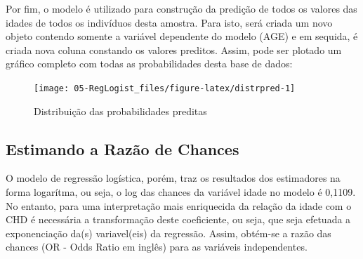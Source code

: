 \documentclass[12pt,brazil,oneside]{book}
\newenvironment{Shaded}{\begin{snugshade}}{\end{snugshade}}
\newcommand{\CommentTok}[1]{\textcolor[rgb]{0.56,0.35,0.01}{\textit{#1}}}
\newcommand{\DataTypeTok}[1]{\textcolor[rgb]{0.13,0.29,0.53}{#1}}
\newcommand{\DecValTok}[1]{\textcolor[rgb]{0.00,0.00,0.81}{#1}}
\newcommand{\KeywordTok}[1]{\textcolor[rgb]{0.13,0.29,0.53}{\textbf{#1}}}
\newcommand{\NormalTok}[1]{#1}
\newcommand{\OperatorTok}[1]{\textcolor[rgb]{0.81,0.36,0.00}{\textbf{#1}}}
\newcommand{\StringTok}[1]{\textcolor[rgb]{0.31,0.60,0.02}{#1}}
\begin{document}
Por fim, o modelo é utilizado para construção da predição de todos os
valores das idades de todos os indivíduos desta amostra. Para isto, será
criada um novo objeto contendo somente a variável dependente do modelo
(AGE) e em sequida, é criada nova coluna constando os valores preditos.
Assim, pode ser plotado um gráfico completo com todas as probabilidades
desta base de dados:

\begin{Shaded}
\end{Shaded}

\begin{figure}[h]

{\centering \texttt{[image: 05-RegLogist\_files/figure-latex/distrpred-1]} 

}

\caption{Distribuição das probabilidades preditas}\label{fig:distrpred}
\end{figure}

\hypertarget{estimando-a-razao-de-chances}{%
\subsection{Estimando a Razão de
Chances}\label{estimando-a-razao-de-chances}}

O modelo de regressão logística, porém, traz os resultados dos
estimadores na forma logarítma, ou seja, o log das chances da variável
idade no modelo é 0,1109. No entanto, para uma interpretação mais
enriquecida da relação da idade com o CHD é necessária a transformação
deste coeficiente, ou seja, que seja efetuada a exponenciação da(s)
variavel(eis) da regressão. Assim, obtém-se a razão das chances (OR -
Odds Ratio em inglês) para as variáveis independentes.
\end{document}
